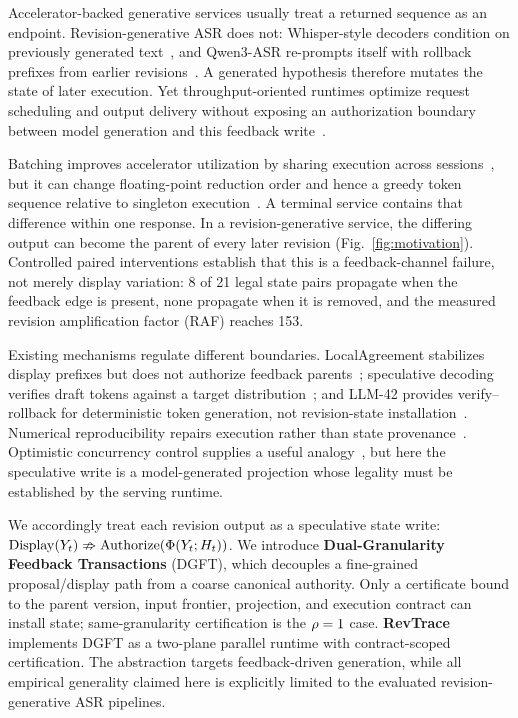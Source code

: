 
Accelerator-backed generative services usually treat a returned sequence as an
endpoint. Revision-generative ASR does not: Whisper-style decoders condition on
previously generated text~\cite{radford2023whisper,machacek2023whisperstreaming},
and Qwen3-ASR re-prompts itself with rollback prefixes from earlier
revisions~\cite{shi2026qwen3asr}. A generated hypothesis therefore mutates the
state of later execution. Yet throughput-oriented runtimes optimize request
scheduling and output delivery without exposing an authorization boundary
between model generation and this feedback write~\cite{kwon2023vllm,yu2022orca,zheng2024sglang}.

Batching improves accelerator utilization by sharing execution across
sessions~\cite{kwon2023vllm,agrawal2024sarathi,zhong2024distserve,sun2024llumnix},
but it can change floating-point reduction order and hence a greedy token
sequence relative to singleton execution~\cite{yuan2025numerical}. A terminal
service contains that difference within one response. In a revision-generative
service, the differing output can become the parent of every later revision
(Fig.~\ref{fig:motivation}). Controlled paired interventions establish that
this is a feedback-channel failure, not merely display variation: 8 of 21
legal state pairs propagate when the feedback edge is present, none propagate
when it is removed, and the measured revision amplification factor (RAF)
reaches 153.

Existing mechanisms regulate different boundaries. LocalAgreement stabilizes
display prefixes but does not authorize feedback parents~\cite{machacek2023whisperstreaming};
speculative decoding verifies draft tokens against a target
distribution~\cite{leviathan2023specdec,chen2023specsample}; and LLM-42 provides
verify--rollback for deterministic token generation, not revision-state
installation~\cite{zhang2026llm42}. Numerical reproducibility repairs execution
rather than state provenance~\cite{yuan2025numerical}. Optimistic concurrency
control supplies a useful analogy~\cite{kung1981occ,bernstein1983mvcc}, but here
the speculative write is a model-generated projection whose legality must be
established by the serving runtime.

We accordingly treat each revision output as a speculative state write:
$\mathrm{Display}(Y_t)\nRightarrow
\mathrm{Authorize}(\Phi(Y_t;H_t))$. We introduce \textbf{Dual-Granularity
Feedback Transactions} (DGFT), which decouples a fine-grained proposal/display
path from a coarse canonical authority. Only a certificate bound to the parent
version, input frontier, projection, and execution contract can install state;
same-granularity certification is the $\rho=1$ case. \textbf{RevTrace}
implements DGFT as a two-plane parallel runtime with contract-scoped
certification. The abstraction targets feedback-driven generation, while all
empirical generality claimed here is explicitly limited to the evaluated
revision-generative ASR pipelines.

